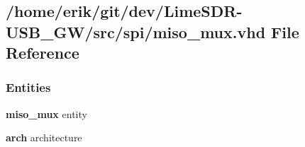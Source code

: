 \subsection{/home/erik/git/dev/\+Lime\+S\+D\+R-\/\+U\+S\+B\+\_\+\+G\+W/src/spi/miso\+\_\+mux.vhd File Reference}
\label{miso__mux_8vhd}
\subsubsection*{Entities}
\begin{DoxyCompactItemize}
\item 
{\bf miso\+\_\+mux} entity
\item 
{\bf arch} architecture
\end{DoxyCompactItemize}
